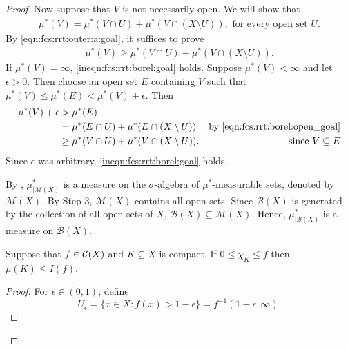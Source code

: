 \begin{proof}
Now suppose that $V$ is not necessarily open. We will show that
\begin{align}
    \label{eqn:fcs:rrt:borel:goal}
     \mu^{\ast}(V) = \mu^{\ast}(V \cap U) + \mu^{\ast}(V \cap (X \setminus U)), \text{ for every open set $U$}.
\end{align}
By \ref{eqn:fcs:rrt:outer:a:goal}, it suffices to prove \begin{align}
     \label{ineqn:fcs:rrt:borel:goal}
     \mu^{\ast}(V) \geq \mu^{\ast}(V \cap U) + \mu^{\ast}(V \cap (X \setminus U)).
\end{align}
If $\mu^{\ast}(V) = \infty$, \ref{ineqn:fcs:rrt:borel:goal} holds. Suppose $\mu^{\ast}(V) < \infty$ and let $\epsilon > 0$. Then choose an open set $E$ containing $V$ such that $\mu^{\ast}(V) \leq \mu^{\ast}(E) < \mu^{\ast}(V) + \epsilon$. Then
\begin{align*}
    \mu^{\ast}(V) + \epsilon &> \mu^{\ast}(E) & \\
                             &= \mu^{\ast}(E \cap U) + \mu^{\ast}(E \cap (X \setminus U)) & \text{by \ref{eqn:fcs:rrt:borel:open_goal}} \\
                             &\geq \mu^{\ast}(V \cap U) + \mu^{\ast}(V \cap (X \setminus U)). & \text{since $V \subseteq E$}
\end{align*}    
Since $\epsilon$ was arbitrary, \ref{ineqn:fcs:rrt:borel:goal} holds.
\newpage
\begin{step}
By , $\mu^{\ast}_{| \mathcal{M}(X)}$ is a measure on the $\sigma$-algebra of $\mu^{\ast}$-measurable sets, denoted by $\mathcal{M}(X)$. By Step 3, $\mathcal{M}(X)$ contains all open sets. Since $\mathcal{B}(X)$ is generated by the collection of all open sets of $X$, $\mathcal{B}(X) \subseteq \mathcal{M}(X)$. Hence, $\mu^{\ast}_{| \mathcal{B}(X)}$ is a measure on $\mathcal{B}(X)$.
\end{step}
\begin{step}
\begin{lemma}
\label{lemma:step:fcs:rrt-positive:reglemma}
Suppose that $f \in {\mathcal C}(X)$ and $K \subseteq X$ is compact. If $0 \leq \chi_K \leq f$ then $\mu(K) \leq I(f)$.
\end{lemma}
\begin{proof}
For $\epsilon \in (0, 1)$, define \begin{equation*}
    U_\epsilon = \{ x \in X : f(x) > 1 - \epsilon \} = f^{-1} (1 - \epsilon, \infty).
\end{equation*}

\end{proof}
\end{step}
\end{proof}
